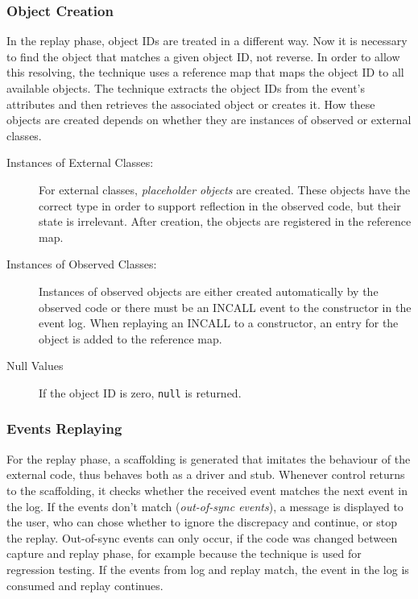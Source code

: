 \subsubsection{Object Creation}
In the replay phase, object IDs are treated in a different way. Now it is necessary to find the object that matches a given object ID, not reverse. In order to allow this resolving, the technique uses a reference map that maps the object ID to all available  objects. The technique extracts the object IDs from the event's attributes and then retrieves the associated object or creates it. How these objects are created depends on whether they are instances of observed or external classes.
\begin{description}
 \item [Instances of External Classes:] For external classes, \emph{placeholder objects} are created. These objects have the correct type in order to support reflection in the observed code, but their state is irrelevant. After creation, the objects are registered in the reference map.  %
 \item [Instances of Observed Classes:] Instances of observed objects are either created automatically by the observed code or there must be an INCALL event to the constructor in the event log. When replaying an INCALL to a constructor, an entry for the object is added to the reference map.
 \item [Null Values] If the object ID is zero, \texttt{null} is returned.
\end{description}

\subsubsection{Events Replaying}
For the replay phase, a scaffolding is generated that imitates the behaviour of the external code, thus behaves both as a driver and stub. Whenever control returns to the scaffolding, it checks whether the received event matches the next event in the log. If the events don't match (\emph{out-of-sync events}), a message is displayed to the user, who can chose whether to ignore the discrepacy and continue, or stop the replay.  Out-of-sync events can only occur, if the code was changed between capture and replay phase, for example because the technique is used for regression testing. If the events from log and replay match, the event in the log is  consumed and replay continues.

